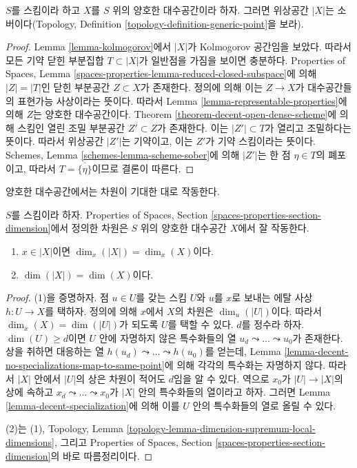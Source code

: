 \begin{proposition}
\label{proposition-reasonable-sober}
$S$를 스킴이라 하고 $X$를 $S$ 위의 양호한 대수공간이라 하자.
그러면 위상공간 $|X|$는 소버이다(Topology, Definition
\ref{topology-definition-generic-point}을 보라).
\end{proposition}

\begin{proof}
Lemma \ref{lemma-kolmogorov}에서 $|X|$가 Kolmogorov 공간임을 보았다.
따라서 모든 기약 닫힌 부분집합 $T \subset |X|$가 일반점을 가짐을
보이면 충분하다. Properties of Spaces, Lemma
\ref{spaces-properties-lemma-reduced-closed-subspace}에 의해
$|Z| = |T|$인 닫힌 부분공간 $Z \subset X$가 존재한다.
정의에 의해 이는 $Z \to X$가 대수공간들의 표현가능 사상이라는
뜻이다. 따라서 Lemma \ref{lemma-representable-properties}에 의해
$Z$는 양호한 대수공간이다. Theorem
\ref{theorem-decent-open-dense-scheme}에 의해 스킴인 열린 조밀
부분공간 $Z' \subset Z$가 존재한다. 이는 $|Z'| \subset T$가 열리고
조밀하다는 뜻이다. 따라서 위상공간 $|Z'|$는 기약이고, 이는 $Z'$가
기약 스킴이라는 뜻이다. Schemes, Lemma
\ref{schemes-lemma-scheme-sober}에 의해 $|Z'|$는 한 점
$\eta \in T$의 폐포이고, 따라서 $T = \overline{\{\eta\}}$이므로
결론이 따른다.
\end{proof}

\noindent
양호한 대수공간에서는 차원이 기대한 대로 작동한다.

\begin{lemma}
\label{lemma-dimension-decent-space}
$S$를 스킴이라 하자. Properties of Spaces, Section
\ref{spaces-properties-section-dimension}에서 정의한 차원은 $S$ 위의
양호한 대수공간 $X$에서 잘 작동한다.
\begin{enumerate}
\item $x \in |X|$이면 $\dim_x(|X|) = \dim_x(X)$이다.
\item $\dim(|X|) = \dim(X)$이다.
\end{enumerate}
\end{lemma}

\begin{proof}
(1)을 증명하자. 점 $u \in U$를 갖는 스킴 $U$와 $u$를 $x$로 보내는
에탈 사상 $h : U \to X$를 택하자. 정의에 의해 $x$에서 $X$의 차원은
$\dim_u(|U|)$이다. 따라서 $\dim_x(X) = \dim(|U|)$가 되도록 $U$를
택할 수 있다. $d$를 정수라 하자. $\dim(U) \geq d$이면 $U$ 안에
자명하지 않은 특수화들의 열
$u_d \leadsto \ldots \leadsto u_0$가 존재한다. 상을 취하면 대응하는 열
$h(u_d) \leadsto \ldots \leadsto h(u_0)$를 얻는데, Lemma
\ref{lemma-decent-no-specializations-map-to-same-point}에 의해 각각의
특수화는 자명하지 않다. 따라서 $|X|$ 안에서 $|U|$의 상은 차원이
적어도 $d$임을 알 수 있다. 역으로 $x_0$가 $|U| \to |X|$의 상에
속하고 $x_d \leadsto \ldots \leadsto x_0$가 $|X|$ 안의 특수화들의
열이라고 하자. 그러면 Lemma \ref{lemma-decent-specialization}에 의해
이를 $U$ 안의 특수화들의 열로 올릴 수 있다.

\medskip\noindent
(2)는 (1), Topology, Lemma
\ref{topology-lemma-dimension-supremum-local-dimensions}, 그리고
Properties of Spaces, Section
\ref{spaces-properties-section-dimension}의 바로 따름정리이다.
\end{proof}

